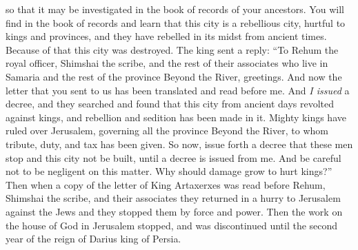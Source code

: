 \begin{biblechapter}
\verse so that it may be investigated in the book of records of your ancestors. You will find in the book of records and learn that this city is a rebellious city, hurtful to kings and provinces, and they have rebelled in its midst from ancient times. Because of that this city was destroyed.
\verse The king sent a reply: “To Rehum the royal officer, Shimshai the scribe, and the rest of their associates who live in Samaria and the rest of the province Beyond the River, greetings. And now
\verse the letter that you sent to us has been translated and read before me.
\verse And \textit{I issued} a decree, and they searched and found that this city from ancient days revolted against kings, and rebellion and sedition has been made in it.
\verse Mighty kings have ruled over Jerusalem, governing all the province Beyond the River, to whom tribute, duty, and tax has been given.
\verse So now, issue forth a decree that these men stop and this city not be built, until a decree is issued from me.
\verse And be careful not to be negligent on this matter. Why should damage grow to hurt kings?”
\verse Then when a copy of the letter of King Artaxerxes was read before Rehum, Shimshai the scribe, and their associates they returned in a hurry to Jerusalem against the Jews and they stopped them by force and power.
\verse Then the work on the house of God in Jerusalem stopped, and was discontinued until the second year of the reign of Darius king of Persia.
\end{biblechapter}

